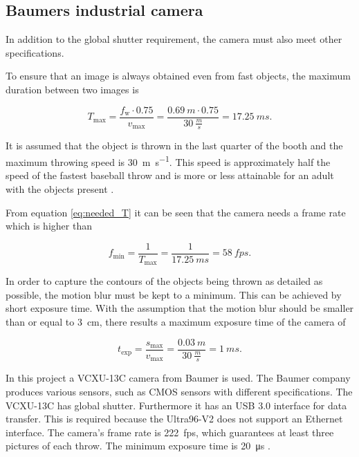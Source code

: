 \subsection{Baumers industrial camera}
\label{subsec:baumer_cam}

In addition to the global shutter requirement, the camera must also meet other specifications.

To ensure that an image is always obtained even from fast objects, the maximum duration between two images is

\begin{equation}
  T_\text{max} = \frac{f_\text{w} \cdot 0.75}{v_\text{max}} = \frac{\SI{0.69}{m} \cdot 0.75}{\SI{30}{\frac{m}{s}}} = \SI{17.25}{ms}.
  \label{eq:needed_T}
\end{equation}

It is assumed that the object is thrown in the last quarter of the booth and the maximum throwing speed is \SI[fraction=sfrac]{30}{\metre\per\second}.
This speed is approximately half the speed of the fastest baseball throw and is more or less attainable for an adult with the objects present \cite{speed_baseball}.

From equation \ref{eq:needed_T} it can be seen that the camera needs a frame rate which is higher than

\begin{equation}
  f_\text{min} = \frac{1}{T_\text{max}} = \frac{1}{\SI{17.25}{ms}} = \SI{58}{fps}.
  \label{eq:needed_fps}
\end{equation}

In order to capture the contours of the objects being thrown as detailed as possible, the motion blur must be kept to a minimum. 
This can be achieved by short exposure time. 
With the assumption that the motion blur should be smaller than or equal to \SI{3}{cm}, there results a maximum exposure time of the camera of

\begin{equation}
  t_\text{exp} = \frac{s_\text{max}}{v_\text{max}} = \frac{\SI{0.03}{m}}{\SI{30}{\frac{m}{s}}} = \SI{1}{ms}.
  \label{eq:texp}
\end{equation}

In this project a VCXU-13C camera from Baumer is used.
The Baumer company produces various sensors, such as CMOS sensors with different specifications.
The VCXU-13C has global shutter.
Furthermore it has an USB 3.0 interface for data transfer.
This is required because the Ultra96-V2 does not support an Ethernet interface.
The camera's frame rate is \SI{222}{fps}, which guarantees at least three pictures of each throw.
The minimum exposure time is \SI{20}{\micro s} \cite{baumer_cam}.

